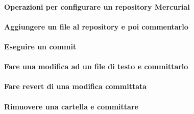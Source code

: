 \documentclass[a4paper]{article}
\begin{document}
		\paragraph{Operazioni per configurare un repository Mercurial}
		
		\paragraph{Aggiungere un file al repository e poi commentarlo}	
		
		\paragraph{Eseguire un commit}
		
		\paragraph{Fare una modifica ad un file di testo e committarlo}
		
		\paragraph{Fare revert di una modifica committata}
		
		\paragraph{Rimuovere una cartella e committare}
		
		
	
\end{document}
